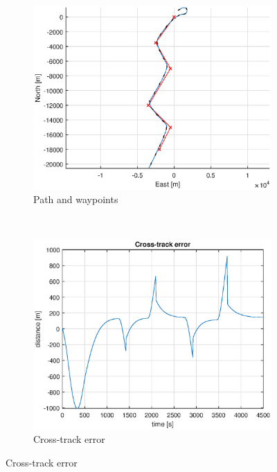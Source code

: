 \begin{figure}[ht]
	\begin{subfigure}[b]{0.4\textwidth}
		\includegraphics[width=\textwidth]{path_2_2}
		\caption{Path and waypoints}
		\label{fig:path_2_2}
	\end{subfigure}%
        ~
	\begin{subfigure}[b]{0.4\textwidth}
		\includegraphics[width=\textwidth]{cross_track_error2_2}
		\caption{Cross-track error}
		\label{fig:cross_track_error2_2}
	\end{subfigure}
	\label{fig:task2_2}
\end{figure}

